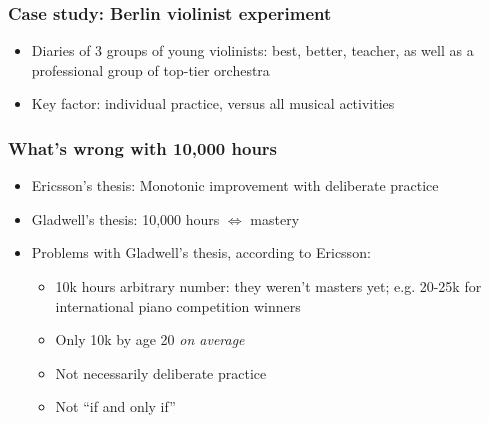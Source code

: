 \documentclass{beamer}
\begin{document}
\begin{frame}
  \frametitle{Case study: Berlin violinist experiment}
  \begin{itemize}
    \item Diaries of 3 groups of young violinists: best, better, teacher, as well as a professional group of top-tier orchestra
    \item Key factor: individual practice, versus all musical activities
  \end{itemize}
\end{frame}

\begin{frame}
  \frametitle{What's wrong with 10,000 hours}
  \begin{itemize}
    \item Ericsson's thesis: Monotonic improvement with deliberate practice
    \item Gladwell's thesis: 10,000 hours $\Leftrightarrow$ mastery
    \item Problems with Gladwell's thesis, according to Ericsson:
      \begin{itemize}
        \item 10k hours arbitrary number: they weren't masters yet; e.g. 20-25k for international piano competition winners
        \item Only 10k by age 20 \textit{on average}
        \item Not necessarily deliberate practice
        \item Not ``if and only if''
      \end{itemize}
  \end{itemize}
\end{frame}
\end{document}
